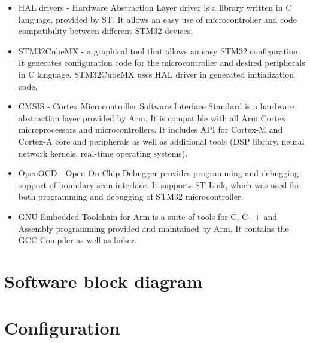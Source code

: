 \documentclass[a4paper,twoside,12pt]{book}
\begin{document}
\begin{itemize}
    \item HAL drivers
    - Hardware Abstraction Layer driver is a library written in C language, provided by ST.
    It allows an easy use of microcontroller and code compatibility between different STM32 devices.
    \item STM32CubeMX
    - a graphical tool that allows an easy STM32 configuration.
    It generates configuration code for the microcontroller and desired peripherals in C language.
    STM32CubeMX uses HAL driver in generated initialization code.
    \item CMSIS
    - Cortex Microcontroller Software Interface Standard
    is a hardware abstraction layer provided by Arm.
    It is compatible with all Arm Cortex microprocessors and microcontrollers.
    It includes API for Cortex-M and Cortex-A core and peripherals as well as additional tools
    (DSP library, neural network kernels, real-time operating systems).
    \item OpenOCD
    - Open On-Chip Debugger provides programming and debugging support of boundary scan interface.
    It supports ST-Link, which was used for both programming and debugging of STM32 microcontroller.
    \item GNU Embedded Toolchain for Arm
    is a suite of tools for C, C++ and Assembly programming provided and maintained by Arm.
    It contains the GCC Compiler as well as linker.
\end{itemize}

\section{Software block diagram}
\cite{ST:UM2407}

\section{Configuration}
\end{document}

